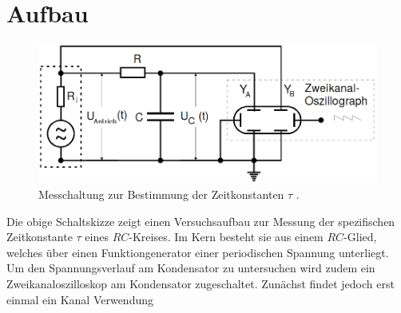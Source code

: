 \section{Aufbau}
\label{sec:Aufbau}


\begin{figure}[H]
 \centering
 \includegraphics[width=\linewidth-200pt,height=\textheight-200pt,keepaspectratio]{content/Aufgabec.png}
 \caption{Messchaltung zur Bestimmung der Zeitkonstanten $\tau$ \cite{V353}.}
 \label{fig:Aufbaua}
\end{figure}
Die obige Schaltskizze zeigt einen Versuchsaufbau zur Messung der spezifischen
 Zeitkonstante $\tau$ eines $RC$-Kreises. Im Kern besteht sie aus einem $RC$-Glied, welches über einen
  Funktiongenerator einer periodischen Spannung unterliegt. Um den
   Spannungsverlauf am Kondensator zu untersuchen wird zudem ein
    Zweikanaloszilloskop am Kondensator zugeschaltet. Zunächst findet jedoch
     erst einmal ein Kanal Verwendung
